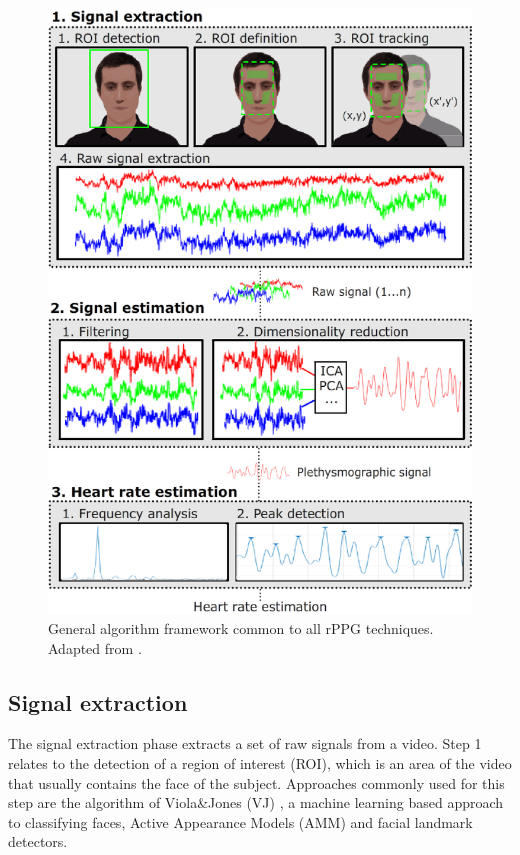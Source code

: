 \begin{figure}
\centering
\includegraphics[width=0.9\linewidth]{figures/general-rppg}
\caption{General algorithm framework common to all rPPG techniques. Adapted from \textcite{rouast2016remote}.}
\label{fig:rppg}
\end{figure}

\subsection{Signal extraction}

The signal extraction phase extracts a set of raw signals from a video. Step 1 relates to the detection of a region of interest (ROI), which is an area of the video that usually contains the face of the subject. Approaches commonly used for this step are the algorithm of Viola\&Jones (VJ) \parencite{ViolaJones}, a machine learning based approach to classifying faces, Active Appearance Models (AMM) \parencite{EdwardsAAM} and facial landmark detectors. %

